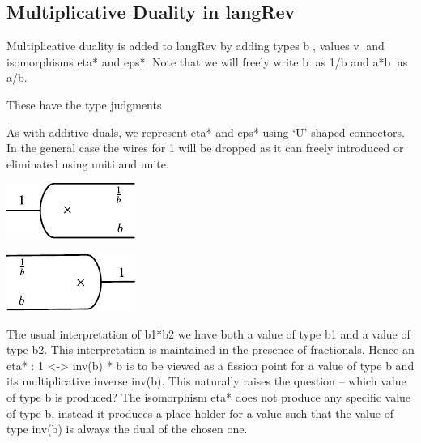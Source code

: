 \documentclass[preprint]{sigplanconf}
\begin{document}
\subsection{Multiplicative Duality in {{langRev}} }

Multiplicative duality is added to {{langRev}} by adding types
{{b^^^}}, values {{v^^^}} and isomorphisms {{eta*}} and {{eps*}}.
Note that we will freely write {{b^^^}} as {{1/b}} and {{a*b^^^}} as
{{a/b}}.

%

\noindent
These have the type judgments



As with additive duals, we represent {{eta*}} and {{eps*}} using
`U'-shaped connectors. In the general case the wires for {{1}} will be
dropped as it can freely introduced or eliminated using {{uniti}} and
{{unite}}. 

\begin{multicols}{2}
\begin{center}
  \includegraphics{diagrams/eta_times.pdf}
\end{center}
  
\begin{center}
  \includegraphics{diagrams/eps_times.pdf}
\end{center}
\end{multicols}

The usual interpretation of {{b1*b2}} we have both a value of type
{{b1}} and a value of type {{b2}}. This interpretation is maintained
in the presence of fractionals. Hence an {{eta* : 1 <-> inv(b) * b}} is
to be viewed as a fission point for a value of type {{b}} and its
multiplicative inverse {{inv(b)}}. This naturally raises the question --
which value of type {{b}} is produced? The isomorphism {{eta*}} does
not produce any specific value of type {{b}}, instead it produces a
place holder for a value such that the value of type {{inv(b)}} is
always the dual of the chosen one. 
\end{document}
